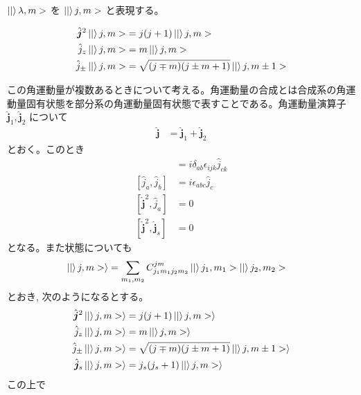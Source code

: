 \documentclass[uplatex,dvipdfmx,a4paper,11pt]{jlreq}
\numberwithin{equation}{section}
\theoremstyle{definition}
\begin{document}
\begin{definition}
  $\ket|\lambda, m>$ を $\ket|j, m>$ と表現する。
\end{definition}

\begin{proposition}
  \begin{align}
    \hat{\bm{j}}^2\ket|j, m> & = j(j + 1)\ket|j, m>                          \\
    \hat{j}_z\ket|j, m>      & = m\ket|j, m>                                 \\
    \hat{j}_\pm\ket|j, m>    & = \sqrt{(j \mp m)(j \pm m + 1)}\ket|j, m\pm1>
  \end{align}
\end{proposition}


この角運動量が複数あるときについて考える。角運動量の合成とは合成系の角運動量固有状態を部分系の角運動量固有状態で表すことである。角運動量演算子 $\hat{\bm{j}}_1, \hat{\bm{j}}_2$ について
\begin{align}
  \hat{\bm{j}} & = \hat{\bm{j}}_1 + \hat{\bm{j}}_2
\end{align}
とおく。このとき
\begin{align}
  [\hat{j}_{a,i}, \hat{j}_{b,j}]   & = i\delta_{ab}\epsilon_{ijk}\hat{j}_{ck} \\
  [\hat{j}_a, \hat{j}_b]           & = i\epsilon_{abc}\hat{j}_c               \\
  [\hat{\bm{j}}^2, \hat{j}_a]      & = 0                                      \\
  [\hat{\bm{j}}^2, \hat{\bm{j}}_s] & = 0
\end{align}
となる。また状態についても
\begin{align}
  \ket|j, m>\rangle & = \sum_{m_1, m_2}C_{j_1m_1j_2m_2}^{jm}\ket|j_1, m_1>\ket|j_2, m_2>
\end{align}
とおき, 次のようになるとする。
\begin{align}
  \hat{\bm{j}}^2\ket|j, m>\rangle & = j(j+1)\ket|j, m>\rangle                           \\
  \hat{j}_z\ket|j, m>\rangle      & = m\ket|j, m>\rangle                                \\
  \hat{j}_\pm\ket|j, m>\rangle    & = \sqrt{(j\mp m)(j\pm m + 1)}\ket|j, m\pm 1>\rangle \\
  \hat{\bm{j}}_s\ket|j, m>\rangle & = j_s(j_s + 1)\ket|j, m>\rangle
\end{align}
この上で
\end{document}
